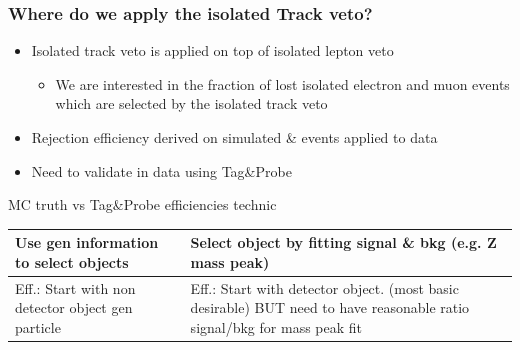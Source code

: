 \documentclass{beamer}
\begin{document}
\begin{frame}
 \frametitle{Where do we apply the isolated Track veto?}
 \begin{itemize}
  \item Isolated track veto is applied on top of isolated lepton veto
  \begin{itemize}
   \item We are interested in the fraction of lost isolated electron and muon events which are selected by the isolated track veto
  \end{itemize}
  \item Rejection efficiency derived on simulated \ttbar \& \wpj events applied to data
  \item Need to validate in data using Tag\&Probe
 \end{itemize}
 \begin{center}
 MC truth vs Tag\&Probe efficiencies technic
 \end{center}
 \begin{tabular}{|p{}|p{}|}
 \hline
  Use gen information to select objects & Select object by fitting signal \& bkg (e.g. Z mass peak) \\ \hline
  Eff.: Start with non detector object gen particle & Eff.: Start with detector object. (most basic desirable) BUT need to have reasonable ratio signal/bkg for mass peak fit\\
  \hline
 \end{tabular}
\end{frame}
\end{document}
